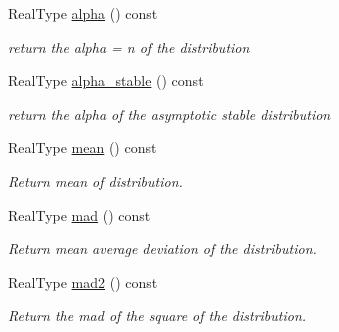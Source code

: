 \begin{DoxyCompactItemize}
\mbox{\label{structstudent__t__distribution_af79519cdd38c501e1d67de31c93f3daf}} 
Real\+Type \mbox{\hyperlink{structstudent__t__distribution_af79519cdd38c501e1d67de31c93f3daf}{alpha}} () const
\begin{DoxyCompactList}\small\item\em return the alpha = n of the distribution \end{DoxyCompactList}\item 
\mbox{\label{structstudent__t__distribution_a5a81f4c1765c03864367ebd280c0a507}} 
Real\+Type \mbox{\hyperlink{structstudent__t__distribution_a5a81f4c1765c03864367ebd280c0a507}{alpha\+\_\+stable}} () const
\begin{DoxyCompactList}\small\item\em return the alpha of the asymptotic stable distribution \end{DoxyCompactList}\item 
\mbox{\label{structstudent__t__distribution_a40784121ffcf86b36f4a107bc128302a}} 
Real\+Type \mbox{\hyperlink{structstudent__t__distribution_a40784121ffcf86b36f4a107bc128302a}{mean}} () const
\begin{DoxyCompactList}\small\item\em Return mean of distribution. \end{DoxyCompactList}\item 
\mbox{\label{structstudent__t__distribution_a037a9539d0054965130936c3da1a5a56}} 
Real\+Type \mbox{\hyperlink{structstudent__t__distribution_a037a9539d0054965130936c3da1a5a56}{mad}} () const
\begin{DoxyCompactList}\small\item\em Return mean average deviation of the distribution. \end{DoxyCompactList}\item 
\mbox{\label{structstudent__t__distribution_aa877e48840101ffcebbe9f844502f99f}} 
Real\+Type \mbox{\hyperlink{structstudent__t__distribution_aa877e48840101ffcebbe9f844502f99f}{mad2}} () const
\begin{DoxyCompactList}\small\item\em Return the mad of the square of the distribution. \end{DoxyCompactList}\item 

\end{DoxyCompactItemize}
